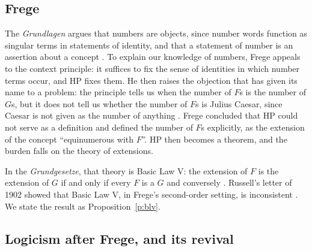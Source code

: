 \documentclass{situationist-preprint}
\begin{document}
\subsection{Frege}

The \emph{Grundlagen} argues that numbers are objects, since number words function as singular terms in statements of identity, and that a statement of number is an assertion about a concept \citep[§§46, 55--57]{Frege1884}. To explain our knowledge of numbers, Frege appeals to the context principle: it suffices to fix the sense of identities in which number terms occur, and HP fixes them. He then raises the objection that has given its name to a problem: the principle tells us when the number of $F$s is the number of $G$s, but it does not tell us whether the number of $F$s is Julius Caesar, since Caesar is not given as the number of anything \citep[§§56, 66]{Frege1884}. Frege concluded that HP could not serve as a definition and defined the number of $F$s explicitly, as the extension of the concept \enquote{equinumerous with $F$}. HP then becomes a theorem, and the burden falls on the theory of extensions.

In the \emph{Grundgesetze}, that theory is Basic Law V: the extension of $F$ is the extension of $G$ if and only if every $F$ is a $G$ and conversely \citep{Frege1893}. Russell's letter of 1902 showed that Basic Law V, in Frege's second-order setting, is inconsistent \citep{Russell1902}. We state the result as Proposition~\ref{p:blv}.

\subsection{Logicism after Frege, and its revival}
\end{document}
